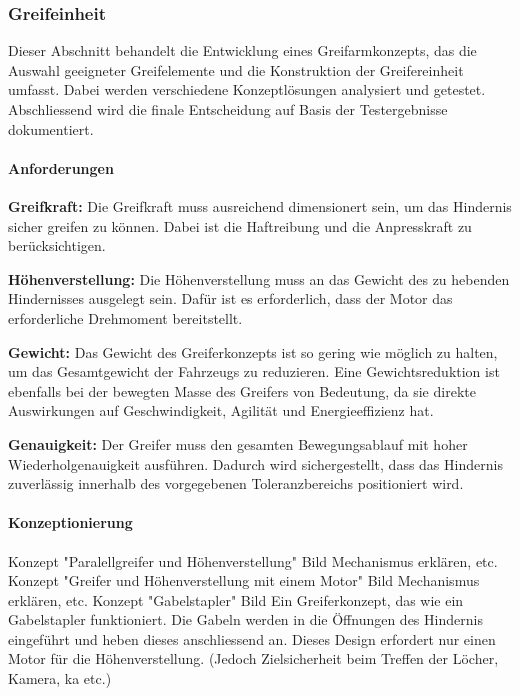 \documentclass[main.tex]{subfiles} %
\begin{document}

\subsubsection{Greifeinheit}

Dieser Abschnitt behandelt die Entwicklung eines Greifarmkonzepts, das die Auswahl 
geeigneter Greifelemente und die Konstruktion der Greifereinheit umfasst. 
Dabei werden verschiedene Konzeptlösungen analysiert und getestet.
Abschliessend wird die finale Entscheidung auf Basis der Testergebnisse dokumentiert.
\paragraph{Anforderungen}

\textbf{Greifkraft:} \newline
Die Greifkraft muss ausreichend dimensionert sein, um das Hindernis sicher greifen zu können. 
Dabei ist die Haftreibung und die Anpresskraft zu berücksichtigen.

\textbf{Höhenverstellung:} \newline
Die Höhenverstellung muss an das Gewicht des zu hebenden Hindernisses ausgelegt sein. 
Dafür ist es erforderlich, dass der Motor das erforderliche Drehmoment bereitstellt.

\textbf{Gewicht:} \newline
Das Gewicht des Greiferkonzepts ist so gering wie möglich zu halten, 
um das Gesamtgewicht der Fahrzeugs zu reduzieren. 
Eine Gewichtsreduktion ist ebenfalls bei der bewegten Masse des Greifers von Bedeutung, 
da sie direkte Auswirkungen auf Geschwindigkeit, Agilität und Energieeffizienz hat.

\textbf{Genauigkeit:} \newline
Der Greifer muss den gesamten Bewegungsablauf mit hoher Wiederholgenauigkeit ausführen. 
Dadurch wird sichergestellt, dass das Hindernis zuverlässig innerhalb des vorgegebenen 
Toleranzbereichs positioniert wird.

\paragraph{Konzeptionierung}
\newline
Konzept "Paralellgreifer und Höhenverstellung"
Bild
Mechanismus erklären, etc.
\newline
Konzept "Greifer und Höhenverstellung mit einem Motor"
Bild
Mechanismus erklären, etc.
\newline
Konzept "Gabelstapler"
Bild
Ein Greiferkonzept, das wie ein Gabelstapler funktioniert. Die Gabeln werden in die Öffnungen 
des Hindernis eingeführt und heben dieses anschliessend an. Dieses Design erfordert nur einen 
Motor für die Höhenverstellung. (Jedoch Zielsicherheit beim Treffen der Löcher, Kamera, ka etc.)
\end{document}
